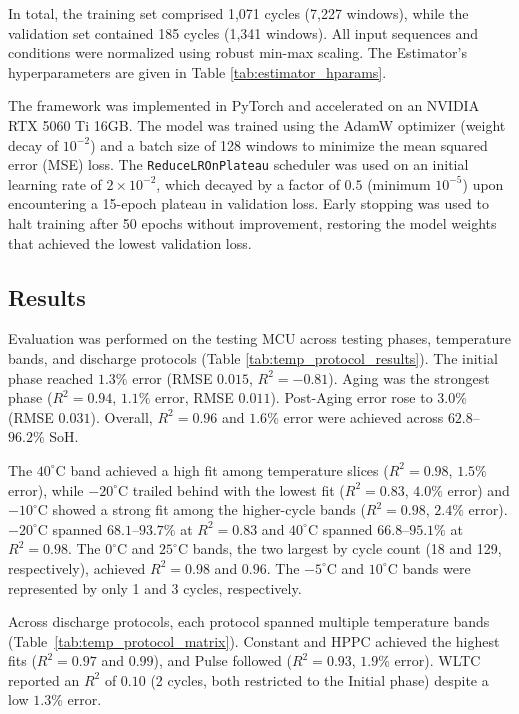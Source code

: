 \documentclass[conference]{IEEEtran}
\begin{document}
In total, the training set comprised 1,071 cycles (7,227 windows), while the validation set contained 185 cycles (1,341 windows). All input sequences and conditions were normalized using robust min-max scaling. The Estimator's hyperparameters are given in Table \ref{tab:estimator_hparams}.



The framework was implemented in PyTorch and accelerated on an NVIDIA RTX 5060 Ti 16GB. The model was trained using the AdamW optimizer (weight decay of $10^{-2}$) and a batch size of 128 windows to minimize the mean squared error (MSE) loss. The \texttt{ReduceLROnPlateau} scheduler was used on an initial learning rate of $2 \times 10^{-2}$, which decayed by a factor of $0.5$ (minimum $10^{-5}$) upon encountering a 15-epoch plateau in validation loss. Early stopping was used to halt training after 50 epochs without improvement, restoring the model weights that achieved the lowest validation loss.

\subsection{Results}
Evaluation was performed on the testing MCU across testing phases, temperature bands, and discharge protocols (Table \ref{tab:temp_protocol_results}).
The initial phase reached $1.3\%$ error (RMSE $0.015$, $R^2 = -0.81$).
Aging was the strongest phase ($R^2 = 0.94$, $1.1\%$ error, RMSE $0.011$).
Post-Aging error rose to $3.0\%$ (RMSE $0.031$). Overall, $R^2 = 0.96$ and $1.6\%$ error were achieved across $62.8$--$96.2\%$ SoH.

The $40^{\circ}\text{C}$ band achieved a high fit among temperature slices ($R^2 = 0.98$, $1.5\%$ error), while $-20^{\circ}\text{C}$ trailed behind with the lowest fit ($R^2 = 0.83$, $4.0\%$ error) and $-10^{\circ}\text{C}$ showed a strong fit among the higher-cycle bands ($R^2 = 0.98$, $2.4\%$ error).
$-20^{\circ}\text{C}$ spanned $68.1$--$93.7\%$ at $R^2 = 0.83$ and $40^{\circ}\text{C}$ spanned $66.8$--$95.1\%$ at $R^2 = 0.98$.
The $0^\circ\text{C}$ and $25^\circ\text{C}$ bands, the two largest by cycle count (18 and 129, respectively), achieved $R^2 = 0.98$ and $0.96$. The $-5^{\circ}\text{C}$ and $10^{\circ}\text{C}$ bands were represented by only 1 and 3 cycles, respectively.

Across discharge protocols, each protocol spanned multiple temperature bands (Table~\ref{tab:temp_protocol_matrix}). Constant and HPPC achieved the highest fits ($R^2 = 0.97$ and $0.99$), and Pulse followed ($R^2 = 0.93$, $1.9\%$ error). WLTC reported an $R^2$ of $0.10$ (2 cycles, both restricted to the Initial phase) despite a low $1.3\%$ error.
\end{document}
